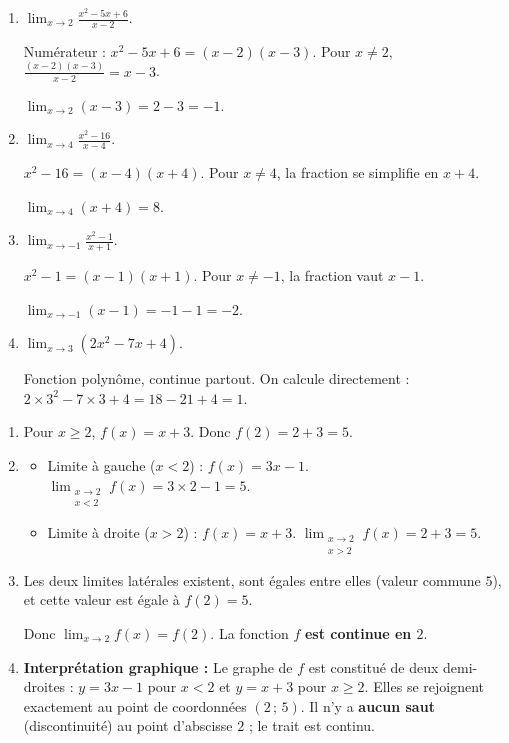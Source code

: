 \documentclass[11pt]{article}
\begin{document}
\begin{corrige}
\begin{enumerate}
\item $\displaystyle\lim_{x \to 2} \frac{x^2-5x+6}{x-2}$. \par
Numérateur : $x^2-5x+6 = (x-2)(x-3)$. Pour $x \neq 2$, $\frac{(x-2)(x-3)}{x-2} = x-3$. \par
$\displaystyle\lim_{x \to 2} (x-3) = 2-3 = \boxed{-1}$.
\item $\displaystyle\lim_{x \to 4} \frac{x^2-16}{x-4}$. \par
$x^2-16 = (x-4)(x+4)$. Pour $x \neq 4$, la fraction se simplifie en $x+4$. \par
$\displaystyle\lim_{x \to 4} (x+4) = \boxed{8}$.
\item $\displaystyle\lim_{x \to -1} \frac{x^2-1}{x+1}$. \par
$x^2-1 = (x-1)(x+1)$. Pour $x \neq -1$, la fraction vaut $x-1$. \par
$\displaystyle\lim_{x \to -1} (x-1) = -1-1 = \boxed{-2}$.
\item $\displaystyle\lim_{x \to 3} (2x^2-7x+4)$. \par
Fonction polynôme, continue partout. On calcule directement : $2\times 3^2 - 7\times 3 + 4 = 18 - 21 + 4 = \boxed{1}$.
\end{enumerate}
\end{corrige}

\begin{corrige}
\begin{enumerate}
\item Pour $x \geq 2$, $f(x) = x+3$. Donc $f(2) = 2+3 = \boxed{5}$.
\item \begin{itemize}
\item Limite à gauche ($x < 2$) : $f(x) = 3x-1$. $\displaystyle\lim_{\substack{x \to 2 \\ x < 2}} f(x) = 3\times 2 - 1 = \boxed{5}$.
\item Limite à droite ($x > 2$) : $f(x) = x+3$. $\displaystyle\lim_{\substack{x \to 2 \\ x > 2}} f(x) = 2+3 = \boxed{5}$.
\end{itemize}
\item Les deux limites latérales existent, sont égales entre elles (valeur commune $5$), et cette valeur est égale à $f(2)=5$. \par
Donc $\displaystyle\lim_{x \to 2} f(x) = f(2)$. La fonction $f$ \textbf{est continue en $2$}.
\item \textbf{Interprétation graphique :} Le graphe de $f$ est constitué de deux demi-droites : $y=3x-1$ pour $x<2$ et $y=x+3$ pour $x \geq 2$. Elles se rejoignent exactement au point de coordonnées $(2\,;\,5)$. Il n'y a \textbf{aucun saut} (discontinuité) au point d'abscisse $2$ ; le trait est continu.
\end{enumerate}
\end{corrige}
\end{document}
